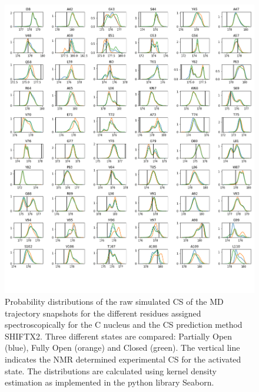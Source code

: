 \documentclass[%
 aip,
 amsmath,amssymb,
 preprint,%
]{revtex4-1}
\begin{document}
\begin{figure}[tbp]
	\includegraphics[width=\textwidth]{figures_SI/hist_shiftx2_C.png}
	 \caption{\scriptsize
 Probability distributions of the raw simulated CS of the MD trajectory snapshots for the different residues assigned spectroscopically for the C nucleus and the CS prediction method SHIFTX2. Three different states are compared: Partially Open (blue), Fully Open (orange) and Closed (green). The vertical line indicates the NMR determined experimental CS for the activated state. The distributions are calculated using kernel density estimation as implemented in the python library Seaborn. 
}
\label{SI_hist3}
\end{figure}
\end{document}
